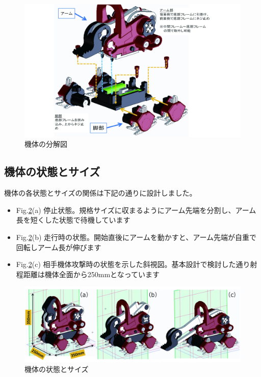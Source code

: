 \begin{figure}[htbp]
\centering
\includegraphics[width=400pt]{fig/fig16_cmyk.jpg}
\caption{機体の分解図}
\label{fig16}
\end{figure}

\clearpage

\subsection{機体の状態とサイズ}\label{ux6a5fux4f53ux306eux72b6ux614bux3068ux30b5ux30a4ux30ba}

機体の各状態とサイズの関係は下記の通りに設計しました。

\begin{itemize}
\tightlist
\item
  Fig.\ref{fig17}(a)
  停止状態。規格サイズに収まるようにアーム先端を分割し、アーム長を短くした状態で待機しています
\item
  Fig.\ref{fig17}(b)
  走行時の状態。開始直後にアームを動かすと、アーム先端が自重で回転しアーム長が伸びます
\item
  Fig.\ref{fig17}(c)
  相手機体攻撃時の状態を示した斜視図。基本設計で検討した通り射程距離は機体全面から250mmとなっています
\end{itemize}

\begin{figure}[htbp]
\centering
\includegraphics[width=380pt]{fig/fig17_cmyk.jpg}
\caption{機体の状態とサイズ}
\label{fig17}
\end{figure}

